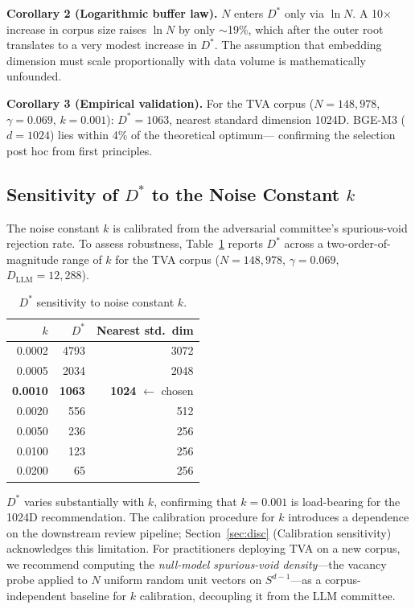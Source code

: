 \documentclass[11pt,twocolumn]{article}
\begin{document}
\textbf{Corollary 2 (Logarithmic buffer law).}
$N$ enters $D^*$ only via $\ln N$.  A 10$\times$ increase in corpus
size raises $\ln N$ by only $\sim$19\%, which after the outer root
translates to a very modest increase in $D^*$.  The assumption that
embedding dimension must scale proportionally with data volume is
mathematically unfounded.

\textbf{Corollary 3 (Empirical validation).}
For the TVA corpus ($N = 148{,}978$, $\gamma = 0.069$, $k = 0.001$):
$D^* = 1063$, nearest standard dimension 1024D.
BGE-M3 ($d=1024$) lies within 4\% of the theoretical optimum---
confirming the selection post hoc from first principles.

\subsection{Sensitivity of $D^*$ to the Noise Constant $k$}

The noise constant $k$ is calibrated from the adversarial committee's
spurious-void rejection rate.  To assess robustness,
Table~\ref{tab:sensitivity} reports $D^*$ across a two-order-of-magnitude
range of $k$ for the TVA corpus
($N=148{,}978$, $\gamma=0.069$, $D_{\mathrm{LLM}}=12{,}288$).

\begin{table}[h]
\centering
\small
\caption{$D^*$ sensitivity to noise constant $k$.}
\label{tab:sensitivity}
\begin{tabular}{rrr}
\toprule
$k$ & $D^*$ & Nearest std.\ dim \\
\midrule
0.0002 & 4793 & 3072 \\
0.0005 & 2034 & 2048 \\
\textbf{0.0010} & \textbf{1063} & \textbf{1024} $\leftarrow$ chosen \\
0.0020 &  556 &  512 \\
0.0050 &  236 &  256 \\
0.0100 &  123 &  256 \\
0.0200 &   65 &  256 \\
\bottomrule
\end{tabular}
\end{table}

$D^*$ varies substantially with $k$, confirming that $k=0.001$ is
load-bearing for the 1024D recommendation.  The calibration procedure
for $k$ introduces a dependence on the downstream review pipeline;
Section~\ref{sec:disc} (Calibration sensitivity) acknowledges this
limitation.  For practitioners deploying TVA on a new corpus, we
recommend computing the \emph{null-model spurious-void density}---the
vacancy probe applied to $N$ uniform random unit vectors on
$S^{d-1}$---as a corpus-independent baseline for $k$ calibration,
decoupling it from the LLM committee.
\end{document}
